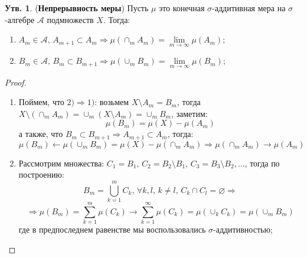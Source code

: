 \documentclass[12pt]{article}
\newcommand{\MA}{\mathcal{A}}
\newcommand{\VN}{\varnothing}
\theoremstyle{definition}
\newtheorem{prop}{Утв.}
\newcommand{\ddsum}[2]{\displaystyle\sum\limits_{#1}^{#2}}
\begin{document}
\newpage
\begin{prop}(\textbf{Непрерывность меры})
	Пусть $\mu$ это конечная $\sigma$-аддитивная мера на $\sigma$-алгебре $\MA$ подмножеств $X$. Тогда:
	\begin{enumerate}[label=\arabic*)]
		\item $A_m \in \MA, \, A_{m+1} \subset A_m \Rightarrow \mu(\cap_m A_m) = \lim\limits_{m \to \infty}\mu(A_m)$;
		\item $B_m \in \MA, \, B_m \subset B_{m+1} \Rightarrow \mu(\cup_m B_m) = \lim\limits_{m \to \infty}\mu(B_m)$;
	\end{enumerate}
\end{prop}
\begin{proof}\hfill
	\begin{enumerate}[label=\arabic*)]
		\item Поймем, что $2) \Rightarrow 1)$: возьмем $X \setminus A_m = B_m$, тогда $X \setminus (\cap_m A_m) = \cup_m (X \setminus A_m) = \cup_m B_m$, заметим:
		$$
			\mu(B_m) = \mu(X) - \mu(A_m)
		$$
		а также, что $B_m \subset B_{m+1} \Rightarrow A_{m+1}\subset A_m$, тогда:
		$$
			\mu(B_m) \leftarrow \mu(\cup_mB_m) = \mu(X) - \mu(\cap_m A_m) \Rightarrow \mu(\cap_m A_m) \to \mu(A_m)
		$$
		\item Рассмотрим множества: $C_1 = B_1, \, C_2 = B_2 \setminus B_1, \, C_3 = B_3 \setminus B_2, \dotsc $, тогда по построению: 
		$$
			B_m = \bigcup\limits_{k = 1}^{m}C_k, \, \forall k,l, \, k \neq l, \,  C_k \cap C_l = \VN \Rightarrow
		$$
		$$
			\Rightarrow \mu(B_m) = \ddsum{k = 1}{m}\mu(C_k) \to \ddsum{k = 1}{\infty}\mu(C_k) = \mu(\cup_k C_k) = \mu(\cup_m B_m)
		$$
		где в предпоследнем равенстве мы воспользовались $\sigma$-аддитивностью;
	\end{enumerate}
\end{proof}
\end{document}
